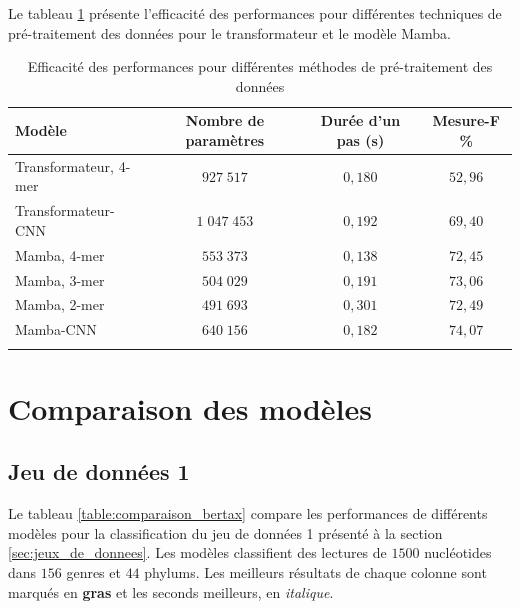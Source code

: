 Le tableau \ref{table:token_results} présente l'efficacité des performances pour différentes
techniques de pré-traitement des données pour le transformateur et le modèle Mamba.

\begin{table}[hbt!]
\centering
\caption{Efficacité des performances pour différentes méthodes de pré-traitement des données
}
\begin{tabular}{lccc} \hline
Modèle                & Nombre de paramètres & Durée d'un pas (s) & Mesure-F \% \\ \hline
Transformateur, 4-mer & $927\;517$           & $0,180$            & $52,96$ \\
Transformateur-CNN    & $1\;047\;453$        & $0,192$            & $69,40$ \\
Mamba, 4-mer          & $553\;373$           & $0,138$            & $72,45$ \\
Mamba, 3-mer          & $504\;029$           & $0,191$            & $73,06$ \\
Mamba, 2-mer          & $491\;693$           & $0,301$            & $72,49$ \\
Mamba-CNN             & $640\;156$           & $0,182$            & $74,07$ \\
\hline
\label{table:token_results}
\end{tabular}
\end{table}

\section{Comparaison des modèles}

\subsection{Jeu de données 1}
Le tableau \ref{table:comparaison_bertax} compare les performances de différents modèles pour la
classification du jeu de données 1 présenté à la section \ref{sec:jeux_de_donnees}. Les modèles
classifient des lectures de $1500$ nucléotides dans $156$ genres et $44$ phylums. Les meilleurs
résultats de chaque colonne sont marqués en \textbf{gras} et les seconds meilleurs, en
\textit{italique}.

